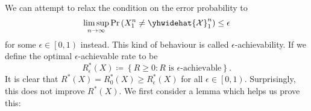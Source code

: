 \documentclass[math, code]{amznotes}
\theoremstyle{remark}
\begin{document}
We can attempt to relax the condition on the error probability to 
\begin{equation*}
    \limsup_{n \to \infty}\Pr\left(X_1^n \neq \yhwidehat{\mathcal{X}}_1^n\right) \leq \epsilon
\end{equation*}
for some $\epsilon \in \left[0, 1\right)$ instead. This kind of behaviour is called $\epsilon$-achievability. If we define the optimal $\epsilon$-achievable rate to be 
\begin{equation*}
    R_{\epsilon}^*\left(X\right) \coloneqq \left\{R \geq 0 \colon R \textrm{ is } \epsilon\textrm{-achievable}\right\}.
\end{equation*}
It is clear that $R^*\left(X\right) = R^*_0\left(X\right) \geq R^*_{\epsilon}\left(X\right)$ for all $\epsilon \in \left[0, 1\right)$. Surprisingly, this does not improve $R^*\left(X\right)$. We first consider a lemma which helps us prove this:
\end{document}
